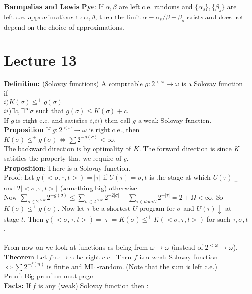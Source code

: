 \documentclass{article}
\begin{document}
       \textbf{Barmpalias and Lewis Pye}: If $\alpha, \beta$ are left c.e. randoms and $\{\alpha_s\}, \{\beta_s\}$ are left c.e. approximations to $\alpha, \beta$, then the limit $\alpha-\alpha_s/ \beta - \beta_s$ exists and does not depend on the choice of approximations.
       \newpage
       \section{Lecture 13}
       \textbf{Definition:} (Solovay functions) A computable $g: 2^{<\omega} \to \omega$ is a Solovay function if \\
       $i) K(\sigma) \leq^+ g(\sigma) $
       \\ $ii) \exists c,\exists^\infty \sigma$ such that $g(\sigma) \leq K(\sigma) + c$. \\
       If  $g$ is right $c.e.$ and satisfies $i,ii)$ then call $g$ a weak Solovay function.
      \textbf{Proposition} If $g: 2^{<\omega} \to \omega$ is right c.e., then $K(\sigma) \leq^+ g(\sigma) \iff \sum 2^{-g(\sigma)} < \infty$.
      \\ The backward direction is by optimality of $K$.  The forward direction is since $K$ satisfies the property that we require of $g$.
      \\
      \textbf{Proposition}: There is a Solovay function.\\
      Proof: Let $g(<\sigma,\tau,t>) = |\tau|$ if $U(\tau) = \sigma, t$ is the stage at which $U(\tau) \downarrow$ and $2|<\sigma,\tau,t>|$ (something big) otherwise.\\
      Now $\sum_{\sigma \in 2^{<\omega}}  2^{-g(\sigma)} \leq \sum_{\sigma \in 2^{<\omega}} 2^{-2|\sigma|} + \sum_{\tau \in dom U} 2^{-|\tau|} = 2+ \Omega < \infty$. So $K(\sigma) \leq^+ g(\sigma)$. Now let $\tau$ be a shortest $U$ program for $\sigma$ and $U(\tau) \downarrow$ at stage $t$. Then $g(<\sigma,\tau,t>) = |\tau| = K(\sigma) \leq^+ K(<\sigma,\tau,t>)$ for such $\tau, \sigma, t$.\\\\
      From now on we look at functions as being from $\omega \to \omega$ (instead of $2^{<\omega} \to \omega$).\\
      \textbf{Theorem} Let $f: \omega \to \omega$ be right c.e.. Then $f$ is a weak Solovay function $\iff \sum 2^{-f(n)}$ is finite and ML -random. (Note that the sum is left c.e.)
      \\
      Proof: Big proof on next page
      \\
      \textbf{Facts:} If $f$ is any (weak) Solovay function then :
\end{document}
